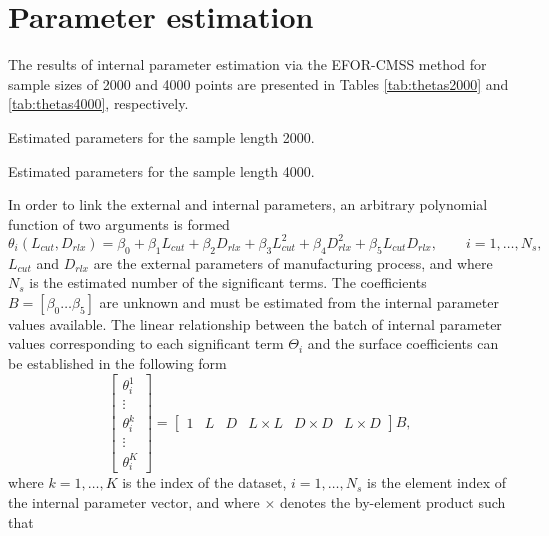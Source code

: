 \documentclass[a4paper,11pt,twoside]{article}
\theoremstyle{mytheoremstyle}
\begin{document}
\section{Parameter estimation}
\par The results of internal parameter estimation via the EFOR-CMSS method for sample sizes of 2000 and 4000 points are presented in Tables \ref{tab:thetas2000} and \ref{tab:thetas4000}, respectively.
\begin{table}[!h]
	\centering
	\caption{Estimated parameters for the sample length 2000.}\label{tab:thetas2000}
	\small
	
\end{table}
\begin{table}[!h]
	\centering
	\caption{Estimated parameters for the sample length 4000.}\label{tab:thetas4000}
	\small
	
\end{table}
\par In order to link the external and internal parameters, an arbitrary polynomial function of two arguments is formed
\begin{equation}
\theta_i(L_{cut},D_{rlx}) = \beta_0 + \beta_1 L_{cut} + \beta_2 D_{rlx} + \beta_3 L_{cut}^{2} + \beta_4 D_{rlx}^{2} + \beta_5 L_{cut} D_{rlx}, \qquad i=1,\dots,N_s,
\end{equation}
$L_{cut}$ and $D_{rlx}$ are the external parameters of manufacturing process, and where $N_s$ is the estimated number of the significant terms. The coefficients $B = \left[ \beta_0 \dots \beta_5 \right]$ are unknown and must be estimated from the internal parameter values available. The linear relationship between the batch of internal parameter values corresponding to each significant term $\Theta_i$ and the surface coefficients can be established in the following form
\begin{equation}\label{eq:linrel}
\left[\begin{array}{c}
\theta_{i}^{1} \\
\vdots \\
\theta_{i}^{k} \\
\vdots \\
\theta_{i}^{K}
\end{array}\right] =
\left[\begin{array}{cccccc}
1 & L& D& L\times L& D\times D& L\times D
\end{array}\right] B,
\end{equation}
where $k = 1, \dots, K$ is the index of the dataset, $i =1, \dots, N_s$ is the element index of the internal parameter vector, and where $\times$ denotes the by-element product such that
\end{document}
